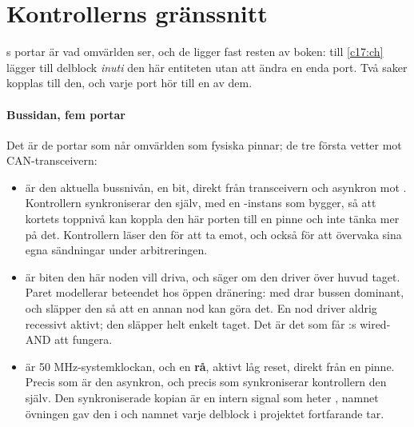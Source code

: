 \section{Kontrollerns gränssnitt}
\label{c11:sec:interface}

s portar är vad omvärlden ser, och de ligger fast resten av boken:
 till \ref{c17:ch} lägger till delblock \emph{inuti} den här entiteten utan att ändra
en enda port. Två saker kopplas till den, och varje port hör till en av dem.


\paragraph{Bussidan, fem portar}
Det är de portar som når omvärlden som fysiska pinnar; de tre första vetter mot CAN-transceivern:
\begin{itemize}
  \item {} är den aktuella bussnivån, en bit, direkt från transceivern och asynkron mot
    . Kontrollern synkroniserar den själv, med en -instans som
     bygger, så att kortets toppnivå kan koppla den här porten till en pinne och inte
    tänka mer på det. Kontrollern läser den för att ta emot, och också för att övervaka sina egna
    sändningar under arbitreringen.
  \item {} är biten den här noden vill driva, och  säger om den driver över
    huvud taget. Paret modellerar beteendet hos öppen dränering:  med
     drar bussen dominant, och  släpper den så att en annan nod
    kan göra det. En nod driver aldrig recessivt aktivt; den släpper helt enkelt taget. Det är det
    som får :s wired-AND att fungera.
  \item {} är 50 MHz-systemklockan, och  en \textbf{rå}, aktivt låg reset,
    direkt från en pinne. Precis som  är den asynkron, och precis som 
    synkroniserar kontrollern den själv. Den synkroniserade kopian är en intern signal som heter
    , namnet övningen  gav den i  och namnet varje
    delblock i projektet fortfarande tar.
\end{itemize}

